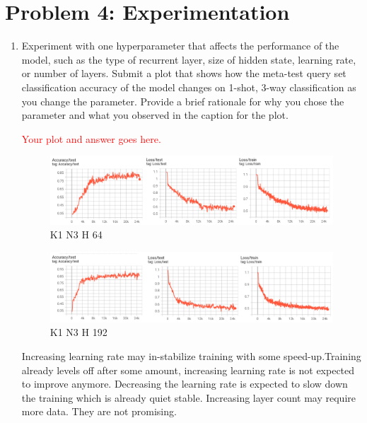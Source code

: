 \documentclass[12pt]{article}
\begin{document}
\section*{Problem 4: Experimentation}
\begin{enumerate}[label=\alph*]
    \item Experiment with one hyperparameter that affects the performance of the model, such as the type of recurrent layer, size of hidden state, learning rate, or number of layers.  Submit a plot that shows how the meta-test query set classification accuracy of the model changes on 1-shot, 3-way classification as you change the parameter. Provide a brief rationale for why you chose the parameter and what you observed in the caption for the plot.
    
    \textcolor{red}{Your plot and answer goes here.}

    \begin{figure}[h]
        \centering
        \includegraphics[scale=1.5]{figures/report/k1_n3_h64}
        \caption{K1 N3 H 64}
    \end{figure}

    \begin{figure}[h]
        \centering
        \includegraphics[scale=1.5]{figures/report/k1_n3_h192}
        \caption{K1 N3 H 192}
    \end{figure}

    \break\newline
    Increasing learning rate may in-stabilize training with some speed-up.Training already levels off after some amount, increasing learning rate is not expected to improve anymore.
    Decreasing the learning rate is expected to slow down the training which is already quiet stable.
    Increasing layer count may require more data. They are not promising.


\end{enumerate}
\end{document}
